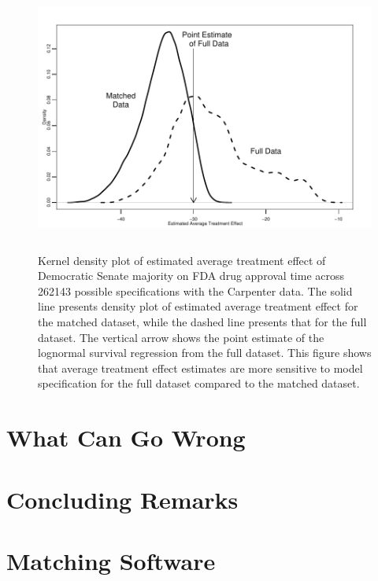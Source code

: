 \documentclass[11pt,titlepage]{article}
\begin{document}
\begin{figure}[t] 
 \begin{center}
    \includegraphics[height=3.5in,angle=0]{figs/fdadens.pdf}
  \end{center}
  \vspace{-0.275in}
  \caption{Kernel density plot of estimated average treatment effect of
    Democratic Senate majority on FDA drug approval time across 262143
    possible specifications with the Carpenter data. The solid line
    presents density plot of estimated average treatment effect for
    the matched dataset, while the dashed line presents that for the
    full dataset.  The vertical arrow shows the point estimate of the
    lognormal survival regression from the full dataset.  This figure
    shows that average treatment effect estimates are more sensitive
    to model specification for the full dataset compared to the
    matched dataset.}
  \label{fg:fdadens}
\end{figure}

\section{What Can Go Wrong}

\section{Concluding Remarks}

\appendix
\section{Matching Software}\label{s:matchit}
\end{document}
